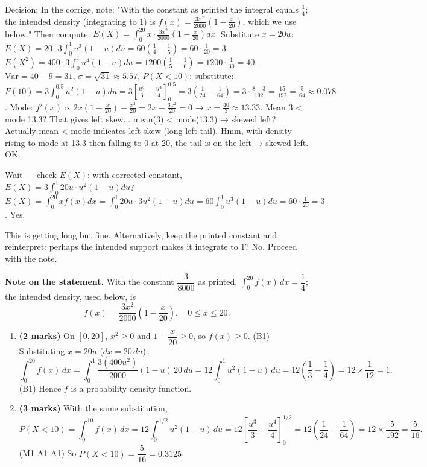 \documentclass[11pt]{article}
\begin{document}
\begin{corrige}
\begin{enumerate}
Decision: In the corrige, note: "With the constant as printed the integral equals $\frac14$; the intended density (integrating to 1) is $f(x)=\frac{3x^2}{2000}\left(1-\frac{x}{20}\right)$, which we use below." Then compute: $E(X)=\int_0^{20} x\cdot\frac{3x^2}{2000}(1-\frac{x}{20})dx$. Substitute $x=20u$: $E(X)=20\cdot 3\int_0^1 u^3(1-u)du=60(\frac14-\frac15)=60\cdot\frac1{20}=3$. $E(X^2)=400\cdot3\int_0^1 u^4(1-u)du=1200(\frac15-\frac16)=1200\cdot\frac1{30}=40$. $\mathrm{Var}=40-9=31$, $\sigma=\sqrt{31}\approx5.57$. $P(X<10)$: substitute: $F(10)=3\int_0^{0.5}u^2(1-u)du=3[\frac{u^3}{3}-\frac{u^4}{4}]_0^{0.5}=3(\frac1{24}-\frac1{64})=3\cdot\frac{8-3}{192}=\frac{15}{192}=\frac5{64}\approx0.078$. Mode: $f'(x)\propto 2x(1-\frac{x}{20})-\frac{x^2}{20}=2x-\frac{3x^2}{20}=0$ → $x=\frac{40}{3}\approx13.33$. Mean 3 < mode 13.3? That gives left skew... mean(3) < mode(13.3) → skewed left? Actually mean < mode indicates left skew (long left tail). Hmm, with density rising to mode at 13.3 then falling to 0 at 20, the tail is on the left → skewed left. OK.

Wait — check $E(X)$: with corrected constant, $E(X)=3\int_0^1 20u\cdot u^2(1-u)du$? $E(X)=\int_0^{20}xf(x)dx=\int_0^1 20u\cdot 3u^2(1-u)du=60\int_0^1 u^3(1-u)du=60\cdot\frac1{20}=3$. Yes.

This is getting long but fine. Alternatively, keep the printed constant and reinterpret: perhaps the intended support makes it integrate to 1? No. Proceed with the note.
\end{enumerate}

\textbf{Note on the statement.} With the constant $\dfrac{3}{8000}$ as printed, $\displaystyle\int_0^{20}f(x)\,dx=\dfrac14$; the intended density, used below, is
\[
f(x)=\frac{3x^2}{2000}\left(1-\frac{x}{20}\right),\quad 0\leq x\leq 20.
\]

\begin{enumerate}
\item \textbf{(2 marks)} On $[0,20]$, $x^2\geq 0$ and $1-\dfrac{x}{20}\geq 0$, so $f(x)\geq 0$. \hfill(B1)
Substituting $x=20u$ ($dx=20\,du$):
\[
\int_0^{20}f(x)\,dx=\int_0^1 \frac{3(400u^2)}{2000}(1-u)\,20\,du=12\int_0^1 u^2(1-u)\,du=12\left(\frac13-\frac14\right)=12\times\frac1{12}=1.
\]
\hfill(B1) \quad Hence $f$ is a probability density function.

\item \textbf{(3 marks)} With the same substitution,
\[
P(X<10)=\int_0^{10}f(x)\,dx=12\int_0^{1/2}u^2(1-u)\,du=12\left[\frac{u^3}{3}-\frac{u^4}{4}\right]_0^{1/2}=12\left(\frac1{24}-\frac1{64}\right)=12\times\frac{5}{192}=\frac{5}{16}.
\]
\hfill(M1 A1 A1) \quad So $P(X<10)=\dfrac{5}{16}=0.3125$.


\end{enumerate}
\end{corrige}
\end{document}
